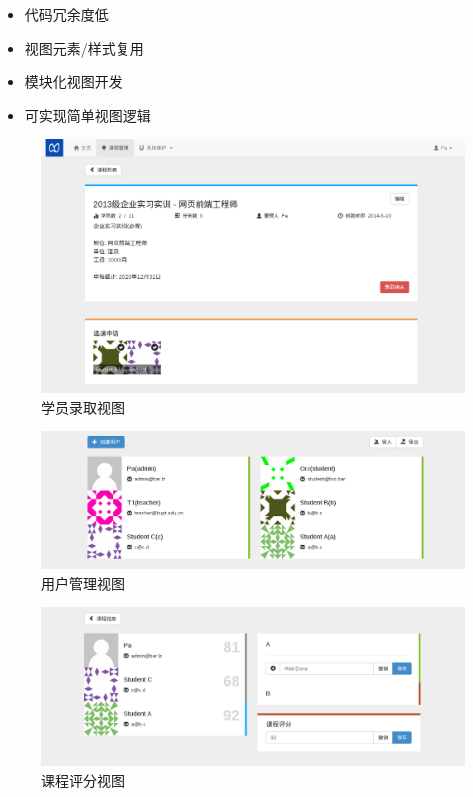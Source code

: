 \begin{itemize}
  \item 代码冗余度低
  \item 视图元素/样式复用
  \item 模块化视图开发
  \item 可实现简单视图逻辑
\end{itemize}

\begin{figure}[!h]
  \begin{center}
    \includegraphics[scale=0.3]{figures/screenshot-enroll.png}
    \caption{学员录取视图\label{SSEnroll}}
  \end{center}
\end{figure}

\begin{figure}[!h]
  \begin{center}
    \includegraphics[scale=0.3]{figures/screenshot-usermgr.png}
    \caption{用户管理视图\label{SSUserMgr}}
  \end{center}
\end{figure}

\begin{figure}[!h]
  \begin{center}
    \includegraphics[scale=0.3]{figures/screenshot-course-review.png}
    \caption{课程评分视图\label{SSCourseReview}}
  \end{center}
\end{figure}

